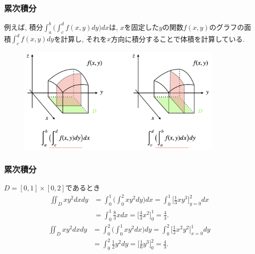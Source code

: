 \documentclass[dvipdfmx,cjk,10.2pt]{beamer}
\theoremstyle{definition}
\begin{document}
\begin{frame}
\frametitle{累次積分}

例えば, 積分$\int_a^b\big( \int_c^d f(x,y)dy\big)dx$は, $x$を固定した$y$の関数$f(x,y)$のグラフの面積$\int_c^d f(x,y)dy$を計算し, 
それを$x$方向に積分することで体積を計算している. 

\begin{figure}[htbp]
 \begin{center} 
  \includegraphics[width=100mm]{2dir.png}
 \end{center}
\end{figure}

\end{frame}




\begin{frame}
\frametitle{累次積分}



$D=[0,1]\times [0,2]$であるとき
\begin{align*}
\iint_Dxy^2 dxdy &= \int_0^1\big( \int_0^2 xy^2dy\big)dx = \int_0^1\big[\frac{1}{3}xy^3\big]_{y=0}^2dx\\
& = \int_0^1 \frac{8}{3}xdx  = \big[ \frac{4}{3}x^2\big]_0^1=\frac{4}{3}. 
\end{align*}
\begin{align*}
\iint_Dxy^2 dxdy &= \int_0^2\big( \int_0^1 xy^2dx\big)dy = \int_0^2\big[\frac{1}{2}x^2y^2\big]_{x=0}^1dy\\
& = \int_0^2 \frac{1}{2}y^2dy  = \big[ \frac{1}{6}y^3\big]_0^2=\frac{4}{3}. 
\end{align*}

\end{frame}


\end{document}
